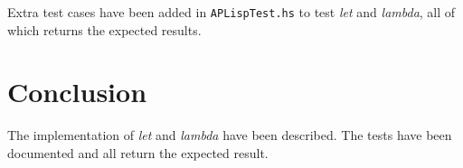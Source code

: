 \documentclass[a4paper, 11pt]{article}
\begin{document}
Extra test cases have been added in \texttt{APLispTest.hs} to test \emph{let} and \emph{lambda}, all of which returns the expected results.


\section{Conclusion} %
\label{sec:conclusion}

The implementation of \emph{let} and \emph{lambda} have been described. The tests have been documented and all return the expected result.

\end{document}
